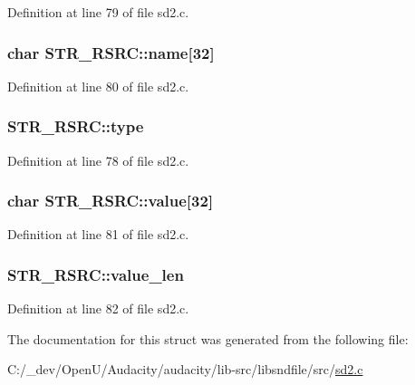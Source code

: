 Definition at line 79 of file sd2.\+c.

\subsubsection[{\texorpdfstring{name}{name}}]{\setlength{\rightskip}{0pt plus 5cm}char S\+T\+R\+\_\+\+R\+S\+R\+C\+::name\mbox{[}32\mbox{]}}\hypertarget{struct_s_t_r___r_s_r_c_a067c2ecf1b8cf086dc212ae745ba0cad}{}\label{struct_s_t_r___r_s_r_c_a067c2ecf1b8cf086dc212ae745ba0cad}


Definition at line 80 of file sd2.\+c.

\subsubsection[{\texorpdfstring{type}{type}}]{ S\+T\+R\+\_\+\+R\+S\+R\+C\+::type}\hypertarget{struct_s_t_r___r_s_r_c_aaf9ee927a9106a52ba7c9272f073db76}{}\label{struct_s_t_r___r_s_r_c_aaf9ee927a9106a52ba7c9272f073db76}


Definition at line 78 of file sd2.\+c.

\subsubsection[{\texorpdfstring{value}{value}}]{\setlength{\rightskip}{0pt plus 5cm}char S\+T\+R\+\_\+\+R\+S\+R\+C\+::value\mbox{[}32\mbox{]}}\hypertarget{struct_s_t_r___r_s_r_c_a42b8f09b20f5749a94aadba8ab8fe16f}{}\label{struct_s_t_r___r_s_r_c_a42b8f09b20f5749a94aadba8ab8fe16f}


Definition at line 81 of file sd2.\+c.

\subsubsection[{\texorpdfstring{value\+\_\+len}{value_len}}]{ S\+T\+R\+\_\+\+R\+S\+R\+C\+::value\+\_\+len}\hypertarget{struct_s_t_r___r_s_r_c_a37af69ee0e36153c34351ce5f45e218a}{}\label{struct_s_t_r___r_s_r_c_a37af69ee0e36153c34351ce5f45e218a}


Definition at line 82 of file sd2.\+c.



The documentation for this struct was generated from the following file\+:\begin{DoxyCompactItemize}
\item 
C\+:/\+\_\+dev/\+Open\+U/\+Audacity/audacity/lib-\/src/libsndfile/src/\hyperlink{sd2_8c}{sd2.\+c}\end{DoxyCompactItemize}
